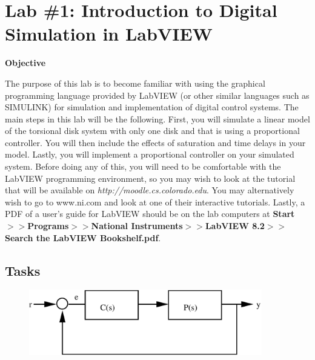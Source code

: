 \pagestyle{fancy}
\fancyhf{}
\fancyfoot[C]{\vspace{.2in}\thepage}


\chapter{Lab \#1:  Introduction to Digital Simulation in LabVIEW}
\date{}
\maketitle
\thispagestyle{fancy}

\begin{center}  \textbf{Objective}
\end{center}

The purpose of this lab is to become familiar with using the graphical
programming language provided by LabVIEW (or other similar languages such as
SIMULINK) for simulation and implementation of digital control systems.  The
main steps in this lab will be the following.  First, you will simulate a linear
model of the torsional disk system with only one disk and that is using a
proportional controller.  You will then include the effects of saturation and
time delays in your model.  Lastly, you will implement a proportional controller
on your simulated system.  Before doing any of this, you will need to be
comfortable with the LabVIEW programming environment, so you may wish to look at
the tutorial that will be available on \emph{http://moodle.cs.colorado.edu}. You
may alternatively wish to go to www.ni.com and look at one of their interactive
tutorials.  Lastly, a PDF of a user's guide for LabVIEW should be on the lab
computers at \textbf{Start$>>$Programs$>>$National Instruments$>>$LabVIEW
  8.2$>>$Search the LabVIEW Bookshelf.pdf}.

\section{Tasks}

\begin{figure}[h!]
\centering
\includegraphics[width=4in]{Lab1/prelimfig1.pdf}
\label{fig-blockdiaglab1}
\end{figure}

